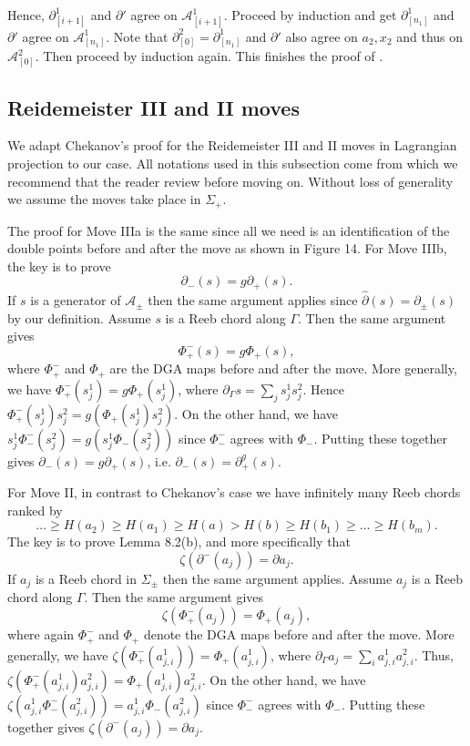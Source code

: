 \documentclass[11pt]{amsart}
\makeatletter
\renewenvironment{proof}[1][\proofname] {\par\pushQED{\qed}{\normalfont\bfseries\topsep6\p@\@plus6\p@\relax #1\@addpunct{.} }}{\popQED\endtrivlist\@endpefalse}
\theoremstyle{mystyle}
\newcommand{\<}{\langle}
\renewcommand{\>}{\rangle}
\makeatother
\begin{document}
\begin{proof}
    Hence, $\partial^1_{[i+1]}$ and $\partial'$ agree on $\mathcal{A}^1_{[i+1]}$. Proceed by induction and get $\partial^1_{[n_1]}$ and $\partial'$ agree on $\mathcal{A}^1_{[n_1]}$. Note that $\partial^2_{[0]} = \partial^1_{[n_1]}$ and $\partial'$ also agree on $a_2, x_2$ and thus on $\mathcal{A}^2_{[0]}$. Then proceed by induction again. This finishes the proof of .
\end{proof}

\subsection{Reidemeister III and II moves} \text{ }

We adapt Chekanov's proof for the Reidemeister III and II moves in Lagrangian projection to our case. All notations used in this subsection come from \cite[Sec 8.2-8.4]{chekanov2002dga} which we recommend that the reader review before moving on. Without loss of generality we assume the moves take place in $\Sigma_+$.

The proof for Move IIIa is the same since all we need is an identification of the double points before and after the move as shown in Figure 14. For Move IIIb, the key is to prove \[\partial_-(s) = g\partial_+(s).\] If $s$ is a generator of $\mathcal{A}_\pm$ then the same argument applies since $\widehat{\partial}(s) = \partial_\pm(s)$ by our definition. Assume $s$ is a Reeb chord along $\Gamma$. Then the same argument gives \[\Phi_+^-(s) = g \Phi_+(s),\] where $\Phi_+^-$ and $\Phi_+$ are the DGA maps before and after the move. More generally, we have $\Phi_+^-(s^1_j) = g\Phi_+(s^1_j)$, where $\partial_\Gamma s = \sum_j s^1_j s^2_j$. Hence $\Phi_+^-(s^1_j)s^2_j = g(\Phi_+(s^1_j)s^2_j)$. On the other hand, we have $s^1_j\Phi_-^-(s^2_j) = g(s^1_j\Phi_-(s^2_j))$ since $\Phi_-^-$ agrees with $\Phi_-$. Putting these together gives $\partial_-(s) = g\partial_+(s)$, i.e. $\partial_-(s) = \partial_+^g(s)$. 

For Move II, in contrast to Chekanov's case we have infinitely many Reeb chords ranked by \[\dots  \geq H(a_2) \geq H(a_1) \geq H(a) > H(b) \geq H(b_1) \geq \dots  \geq H(b_m).\] The key is to prove Lemma 8.2(b), and more specifically that \[\zeta(\partial^-(a_j)) = \partial a_j.\] If $a_j$ is a Reeb chord in $\Sigma_\pm$ then the same argument applies. Assume $a_j$ is a Reeb chord along $\Gamma$. Then the same argument gives \[\zeta(\Phi_+^-(a_j)) = \Phi_+(a_j),\] where again $\Phi_+^-$ and $\Phi_+$ denote the DGA maps before and after the move. More generally, we have $\zeta(\Phi^-_+(a_{j, i}^1)) = \Phi_+(a_{j, i}^1)$, where $\partial_\Gamma a_j = \sum_i a_{j, i}^1 a_{j, i}^2$. Thus, $\zeta(\Phi^-_+(a_{j, i}^1)a_{j, i}^2) = \Phi_+(a_{j, i}^1)a_{j, i}^2$. On the other hand, we have $\zeta(a_{j, i}^1\Phi^-_-(a_{j, i}^2)) = a_{j, i}^1\Phi_-(a_{j, i}^2)$ since $\Phi^-_-$ agrees with $\Phi_-$. Putting these together gives $\zeta(\partial^-(a_j)) = \partial a_j$.


\nocite{*}
{
\printbibliography}
\end{document}
